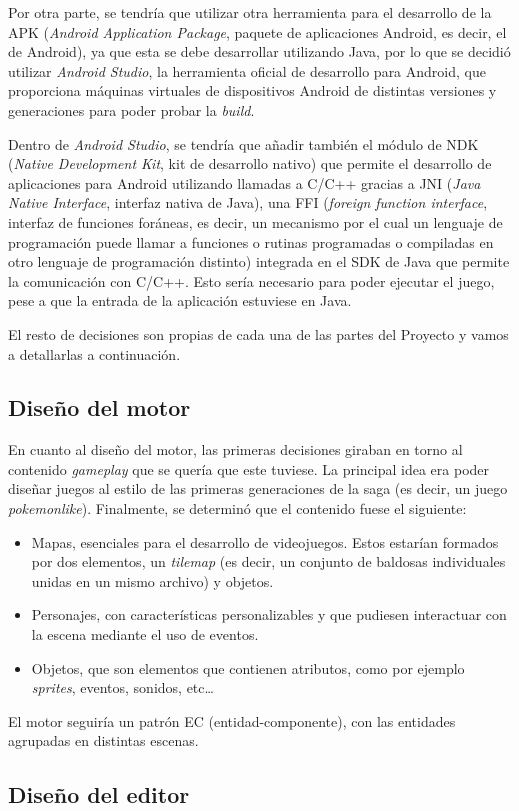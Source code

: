 \medskip

Por otra parte, se tendría que utilizar otra herramienta para el desarrollo de la APK (\textit{Android Application Package}, paquete de aplicaciones Android, es decir, el  de Android), ya que esta se debe desarrollar utilizando Java, por lo que se decidió utilizar \textit{Android Studio}, la herramienta oficial de desarrollo para Android, que proporciona máquinas virtuales de dispositivos Android de distintas versiones y generaciones para poder probar la \textit{build}.

\smallskip

Dentro de \textit{Android Studio}, se tendría que añadir también el módulo de NDK (\textit{Native Development Kit}, kit de desarrollo nativo) que permite el desarrollo de aplicaciones para Android utilizando llamadas a C/C++ gracias a JNI (\textit{Java Native Interface}, interfaz nativa de Java), una FFI (\textit{foreign function interface}, interfaz de funciones foráneas, es decir, un mecanismo por el cual un lenguaje de programación puede llamar a funciones o rutinas programadas o compiladas en otro lenguaje de programación distinto) integrada en el SDK de Java que permite la comunicación con C/C++. Esto sería necesario para poder ejecutar el juego, pese a que la entrada de la aplicación estuviese en Java.

\medskip

El resto de decisiones son propias de cada una de las partes del Proyecto y vamos a detallarlas a continuación.

\subsection{Diseño del motor}
En cuanto al diseño del motor, las primeras decisiones giraban en torno al contenido \textit{gameplay} que se quería que este tuviese. La principal idea era poder diseñar juegos al estilo de las primeras generaciones de la saga \cite{pokemon} (es decir, un juego \textit{pokemonlike}). Finalmente, se determinó que el contenido fuese el siguiente:
\begin{itemize}
	\item Mapas, esenciales para el desarrollo de videojuegos. Estos estarían formados por dos elementos, un \textit{tilemap} (es decir, un conjunto de baldosas individuales unidas en un mismo archivo) y objetos.
	\item Personajes, con características personalizables y que pudiesen interactuar con la escena mediante el uso de eventos.
	\item Objetos, que son elementos que contienen atributos, como por ejemplo \textit{sprites}, eventos, sonidos, etc\ldots
\end{itemize}

El motor seguiría un patrón EC (entidad-componente), con las entidades agrupadas en distintas escenas.

\subsection{Diseño del editor}

